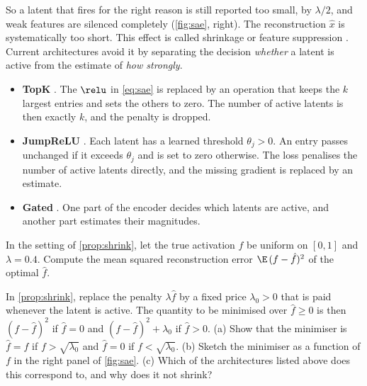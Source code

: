 So a latent that fires for the right reason is still reported too small, by $\lambda/2$, and weak features are
silenced completely (\cref{fig:sae}, right). The reconstruction $\hat x$ is systematically too short. This effect
is called shrinkage or feature suppression \citep{wright2024addressing}. Current architectures avoid it by
separating the decision \emph{whether} a latent is active from the estimate of \emph{how strongly}.

\begin{itemize}
\item \textbf{TopK} \citep{gao2025scaling}. The $\relu$ in \eqref{eq:sae} is replaced by an operation that keeps
the $k$ largest entries and sets the others to zero. The number of active latents is then exactly $k$, and the
penalty is dropped.
\item \textbf{JumpReLU} \citep{rajamanoharan2024jumping}. Each latent has a learned threshold $\theta_j>0$.
An entry passes unchanged if it exceeds $\theta_j$ and is set to zero otherwise. The loss penalises the number
of active latents directly, and the missing gradient is replaced by an estimate.
\item \textbf{Gated} \citep{rajamanoharan2024improving}. One part of the encoder decides which latents are
active, and another part estimates their magnitudes.
\end{itemize}

\begin{exercise}\label{ex:fvu}
In the setting of \cref{prop:shrink}, let the true activation $f$ be uniform on $[0,1]$ and $\lambda=0.4$. Compute
the mean squared reconstruction error $\E\,(f-\hat f)^2$ of the optimal $\hat f$.
\end{exercise}

\begin{exercise}\label{ex:hard}
In \cref{prop:shrink}, replace the penalty $\lambda\hat f$ by a fixed price $\lambda_0>0$ that is paid whenever
the latent is active. The quantity to be minimised over $\hat f\ge0$ is then $(f-\hat f)^2$ if $\hat f=0$ and
$(f-\hat f)^2+\lambda_0$ if $\hat f>0$. (a) Show that the minimiser is $\hat f=f$ if $f>\sqrt{\lambda_0}$ and
$\hat f=0$ if $f<\sqrt{\lambda_0}$. (b) Sketch the minimiser as a function of $f$ in the right panel of
\cref{fig:sae}. (c) Which of the architectures listed above does this correspond to, and why does it not shrink?
\end{exercise}

